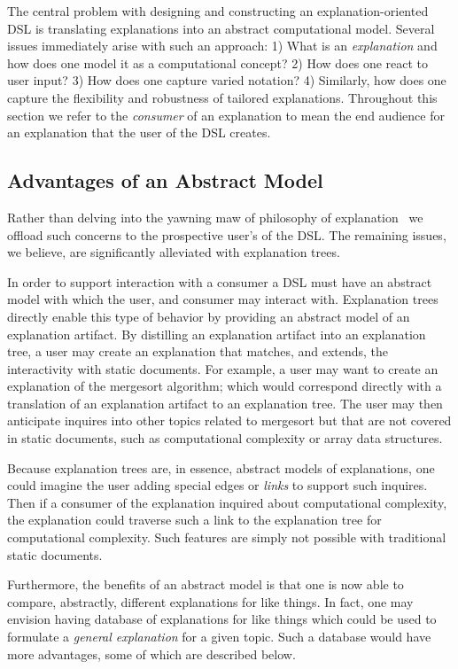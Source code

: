 \documentclass[sigconf]{acmart}
\begin{document}
The central problem with designing and constructing an explanation-oriented DSL
is translating explanations into an abstract computational model. Several issues
immediately arise with such an approach: 1) What is an \emph{explanation} and
how does one model it as a computational concept? 2) How does one react to user
input? 3) How does one capture varied notation? 4) Similarly, how does one
capture the flexibility and robustness of tailored explanations. Throughout this
section we refer to the \emph{consumer} of an explanation to mean the end
audience for an explanation that the user of the DSL creates.

\subsection{Advantages of an Abstract Model}
\label{sec:dis:model}

Rather than delving into the yawning maw of philosophy of
explanation~\cite{sep-scientific-explanation} we offload such concerns to the
prospective user's of the DSL. The remaining issues, we believe, are
significantly alleviated with explanation trees.

In order to support interaction with a consumer a DSL must have an abstract
model with which the user, and consumer may interact with. Explanation trees
directly enable this type of behavior by providing an abstract model of an
explanation artifact.
%
By distilling an explanation artifact into an explanation tree, a user may
create an explanation that matches, and extends, the interactivity with static
documents. For example, a user may want to create an explanation of the
mergesort algorithm; which would correspond directly with a translation of an
explanation artifact to an explanation tree. The user may then anticipate
inquires into other topics related to mergesort but that are not covered in
static documents, such as computational complexity or array data structures.

Because explanation trees are, in essence, abstract models of explanations, one
could imagine the user adding special edges or \emph{links} to support such
inquires. Then if a consumer of the explanation inquired about computational
complexity, the explanation could traverse such a link to the explanation tree
for computational complexity. Such features are simply not possible with
traditional static documents.

Furthermore, the benefits of an abstract model is that one is now able to
compare, abstractly, different explanations for like things. In fact, one may
envision having database of explanations for like things which could be used to
formulate a \emph{general explanation} for a given topic. Such a database would
have more advantages, some of which are described below.
\end{document}

